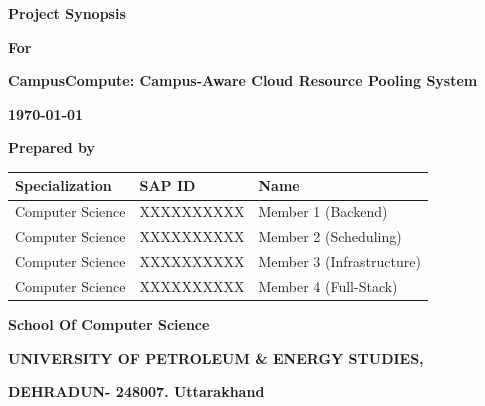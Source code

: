 \documentclass[12pt,a4paper]{article}
\begin{document}
\begin{titlepage}
    \centering
    \vspace*{2cm}
    
    {\fontsize{16}{20}\selectfont\bfseries Project Synopsis\par}
    \vspace{1.5cm}
    
    {\fontsize{14}{18}\selectfont\bfseries For\par}
    \vspace{1cm}
    
    {\fontsize{14}{18}\selectfont\bfseries CampusCompute: Campus-Aware Cloud Resource Pooling System\par}
    \vspace{1cm}
    
    {\fontsize{12}{16}\selectfont\bfseries \today\par}
    \vspace{3cm}
    
    {\fontsize{12}{16}\selectfont\bfseries Prepared by\par}
    \vspace{1cm}
    
    \begin{tabular}{|p{4cm}|p{3cm}|p{5cm}|}
        \hline
        \textbf{Specialization} & \textbf{SAP ID} & \textbf{Name} \\
        \hline
        Computer Science & XXXXXXXXXX & Member 1 (Backend) \\
        \hline
        Computer Science & XXXXXXXXXX & Member 2 (Scheduling) \\
        \hline
        Computer Science & XXXXXXXXXX & Member 3 (Infrastructure) \\
        \hline
        Computer Science & XXXXXXXXXX & Member 4 (Full-Stack) \\
        \hline
    \end{tabular}
    
    \vfill
    
    {\fontsize{12}{16}\selectfont\bfseries School Of Computer Science\par}
    {\fontsize{12}{16}\selectfont\bfseries UNIVERSITY OF PETROLEUM \& ENERGY STUDIES,\par}
    {\fontsize{12}{16}\selectfont\bfseries DEHRADUN- 248007. Uttarakhand\par}
    
\end{titlepage}
\end{document}
